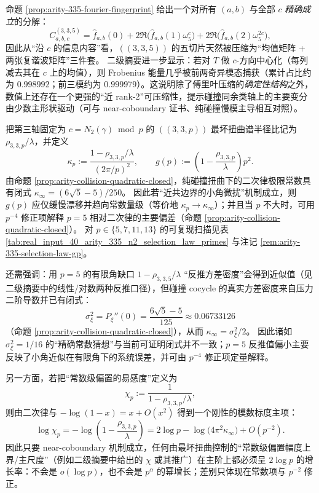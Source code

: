 \begin{remark}\label{rem:arity-335-low-rank-source}
命题 \ref{prop:arity-335-fourier-fingerprint} 给出一个对所有 $(a,b)$ 与全部 $c$ \emph{精确成立}的分解：
\[
C^{(3,3,5)}_{a,b,c}
=\widehat f_{a,b}(0)+2\Re\bigl(\widehat f_{a,b}(1)\omega_5^{c}\bigr)+2\Re\bigl(\widehat f_{a,b}(2)\omega_5^{2c}\bigr),
\]
因此从“沿 $c$ 的信息内容”看，\(((3,3,5))\) 的五切片天然被压缩为“均值矩阵 + 两张复谐波矩阵”三件套。
二级摘要进一步显示：若对 $T$ 做 $c$-方向中心化（每列减去其在 $c$ 上的均值），则 Frobenius 能量几乎被前两奇异模态捕获（累计占比约为 $0.998992$；前三模约为 $0.999979$）。这说明除了傅里叶压缩的\emph{确定性结构}之外，数值上还存在一个更强的“近 rank-2”可压缩性，提示碰撞同余类轴上的主要变分由少数主形状驱动（可与 near-coboundary 证书、纯碰撞慢模主导相互对照）。
\end{remark}

\begin{remark}\label{rem:arity-335-near-coboundary-scaling}
把第三轴固定为 $c=N_2(\gamma)\bmod p$ 的 \(((3,3,p))\) 最坏扭曲谱半径比记为 \(\rho_{3,3,p}/\lambda\)，并定义
\[
\kappa_p:=\frac{1-\rho_{3,3,p}/\lambda}{(2\pi/p)^2},
\qquad
g(p):=\left(1-\frac{\rho_{3,3,p}}{\lambda}\right)p^2.
\]
由命题 \ref{prop:arity-collision-quadratic-closed}，纯碰撞扭曲下的二次律极限常数具有闭式
\(
\kappa_\infty=(6\sqrt5-5)/250
\)。
因此若“近共边界的小角微扰”机制成立，则 \(g(p)\) 应仅缓慢漂移并趋向常数量级（等价地 \(\kappa_p\to\kappa_\infty\)）；并且当 \(p\) 不大时，可用 \(p^{-4}\) 修正项解释 \(p=5\) 相对二次律的主要偏差（命题 \ref{prop:arity-collision-quadratic-closed}）。
对 \(p\in\{5,7,11,13\}\) 的可复现扫描见表 \ref{tab:real_input_40_arity_335_n2_selection_law_primes} 与注记 \ref{rem:arity-335-selection-law-gp}。
\par
还需强调：用 \(p=5\) 的有限角缺口 \(1-\rho_{3,3,5}/\lambda\) “反推方差密度”会得到近似值（见二级摘要中的线性/对数两种反推口径），但碰撞 cocycle 的真实方差密度来自压力二阶导数并已有闭式：
\[
\sigma_\xi^2=P_\xi''(0)=\frac{6\sqrt5-5}{125}\approx 0.06733126
\]
（命题 \ref{prop:arity-collision-quadratic-closed}），从而 \(\kappa_\infty=\sigma_\xi^2/2\)。
因此诸如 \(\sigma_\xi^2=1/16\) 的“精确常数猜想”与当前可证明闭式并不一致；\(p=5\) 反推值偏小主要反映了小角近似在有限角下的系统误差，并可由 \(p^{-4}\) 修正项定量解释。
\par
另一方面，若把“常数级偏置的易感度”定义为
\[
\chi_p:=\frac{1}{1-\rho_{3,3,p}/\lambda},
\]
则由二次律与 \(-\log(1-x)=x+O(x^2)\) 得到一个刚性的模数标度主项：
\[
\log\chi_p
=-\log\!\left(1-\frac{\rho_{3,3,p}}{\lambda}\right)
=2\log p-\log\!\bigl(4\pi^2\kappa_\infty\bigr)+O(p^{-2}).
\]
因此只要 near-coboundary 机制成立，任何由最坏扭曲控制的“常数级偏置幅度上界/主尺度”（例如二级摘要中给出的 \(\chi\) 或其推广）在主阶上都必须呈 \(2\log p\) 的增长率：不会是 \(o(\log p)\)，也不会是 \(p^\alpha\) 的幂增长；差别只体现在常数项与 \(p^{-2}\) 修正。
\end{remark}

